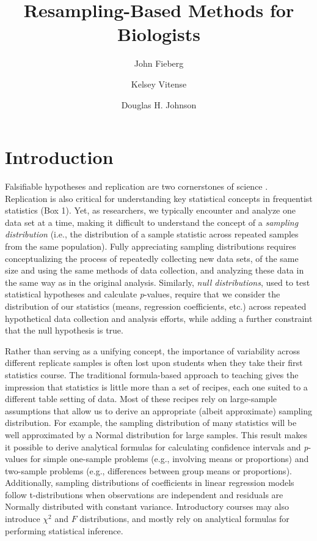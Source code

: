 \documentclass[fleqn,10pt]{wlpeerj} %
\title{Resampling-Based Methods for Biologists}
\author[1]{John Fieberg}
\author[1]{Kelsey Vitense}
\author[1]{Douglas H. Johnson}
\affil[1]{Department of Fisheries, Wildlife and Conservation Biology, University of Minnesota, 2003 Upper Buford Circle, Suite 135, Saint Paul MN 55108, USA}
\begin{document}
\flushbottom
\maketitle
\thispagestyle{empty}

\hypertarget{introduction}{%
\section*{Introduction}\label{introduction}}

Falsifiable hypotheses and replication are two cornerstones of science \citep{johnson2002importance, popper2005logic}. Replication is also critical for understanding key statistical concepts in frequentist statistics (Box 1). Yet, as researchers, we typically encounter and analyze one data set at a time, making it difficult to understand the concept of a \emph{sampling distribution} (i.e., the distribution of a sample statistic across repeated samples from the same population). Fully appreciating sampling distributions requires conceptualizing the process of repeatedly collecting new data sets, of the same size and using the same methods of data collection, and analyzing these data in the same way as in the original analysis. Similarly, \emph{null distributions}, used to test statistical hypotheses and calculate \emph{p}-values, require that we consider the distribution of our statistics (means, regression coefficients, etc.) across repeated hypothetical data collection and analysis efforts, while adding a further constraint that the null hypothesis is true.

Rather than serving as a unifying concept, the importance of variability across different replicate samples is often lost upon students when they take their first statistics course. The traditional formula-based approach to teaching gives the impression that statistics is little more than a set of recipes, each one suited to a different table setting of data. Most of these recipes rely on large-sample assumptions that allow us to derive an appropriate (albeit approximate) sampling distribution. For example, the sampling distribution of many statistics will be well approximated by a Normal distribution for large samples. This result makes it possible to derive analytical formulas for calculating confidence intervals and \emph{p}-values for simple one-sample problems (e.g., involving means or proportions) and two-sample problems (e.g., differences between group means or proportions). Additionally, sampling distributions of coefficients in linear regression models follow t-distributions when observations are independent and residuals are Normally distributed with constant variance. Introductory courses may also introduce \(\chi^2\) and \(F\) distributions, and mostly rely on analytical formulas for performing statistical inference.
\end{document}

